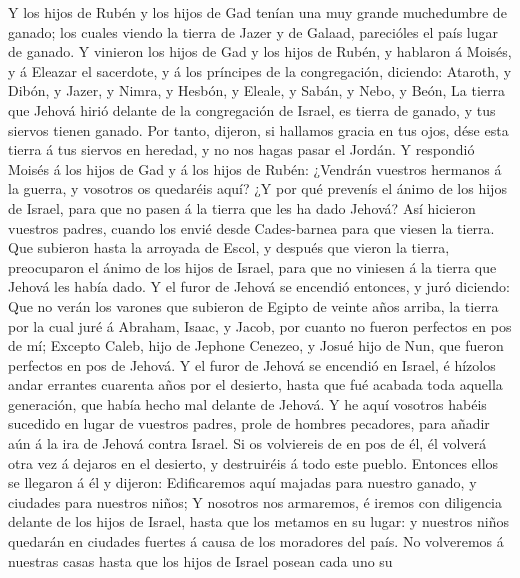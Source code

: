  Y los hijos de Rubén y los hijos de Gad tenían una muy
grande muchedumbre de ganado; los cuales viendo la tierra de Jazer y de
Galaad, parecióles el país lugar de ganado.  Y vinieron
los hijos de Gad y los hijos de Rubén, y hablaron á Moisés, y á Eleazar
el sacerdote, y á los príncipes de la congregación, diciendo:
 Ataroth, y Dibón, y Jazer, y Nimra, y Hesbón, y Eleale, y
Sabán, y Nebo, y Beón,  La tierra que Jehová hirió delante
de la congregación de Israel, es tierra de ganado, y tus siervos tienen
ganado.  Por tanto, dijeron, si hallamos gracia en tus
ojos, dése esta tierra á tus siervos en heredad, y no nos hagas pasar el
Jordán.  Y respondió Moisés á los hijos de Gad y á los
hijos de Rubén: ¿Vendrán vuestros hermanos á la guerra, y vosotros os
quedaréis aquí?  ¿Y por qué prevenís el ánimo de los hijos
de Israel, para que no pasen á la tierra que les ha dado Jehová?
 Así hicieron vuestros padres, cuando los envié desde
Cades-barnea para que viesen la tierra.  Que subieron
hasta la arroyada de Escol, y después que vieron la tierra, preocuparon
el ánimo de los hijos de Israel, para que no viniesen á la tierra que
Jehová les había dado.  Y el furor de Jehová se encendió
entonces, y juró diciendo:  Que no verán los varones que
subieron de Egipto de veinte años arriba, la tierra por la cual juré á
Abraham, Isaac, y Jacob, por cuanto no fueron perfectos en pos de mí;
 Excepto Caleb, hijo de Jephone Cenezeo, y Josué hijo de
Nun, que fueron perfectos en pos de Jehová.  Y el furor
de Jehová se encendió en Israel, é hízolos andar errantes cuarenta años
por el desierto, hasta que fué acabada toda aquella generación, que
había hecho mal delante de Jehová.  Y he aquí vosotros
habéis sucedido en lugar de vuestros padres, prole de hombres pecadores,
para añadir aún á la ira de Jehová contra Israel.  Si os
volviereis de en pos de él, él volverá otra vez á dejaros en el
desierto, y destruiréis á todo este pueblo.  Entonces
ellos se llegaron á él y dijeron: Edificaremos aquí majadas para nuestro
ganado, y ciudades para nuestros niños;  Y nosotros nos
armaremos, é iremos con diligencia delante de los hijos de Israel, hasta
que los metamos en su lugar: y nuestros niños quedarán en ciudades
fuertes á causa de los moradores del país.  No volveremos
á nuestras casas hasta que los hijos de Israel posean cada uno su
